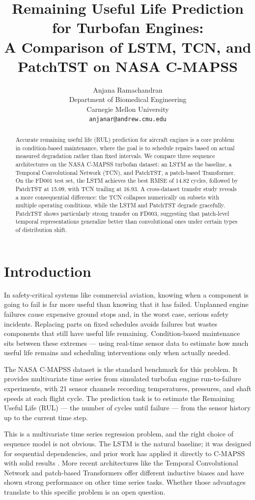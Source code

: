 \documentclass{article}
\title{Remaining Useful Life Prediction for Turbofan Engines:\\
A Comparison of LSTM, TCN, and PatchTST on NASA C-MAPSS}
\author{
  Anjana Ramachandran \\
  Department of Biomedical Engineering \\
  Carnegie Mellon University \\
  \texttt{anjanar@andrew.cmu.edu}
}
\begin{document}
\maketitle

\begin{abstract}
Accurate remaining useful life (RUL) prediction for aircraft engines is a core problem in condition-based maintenance, where the goal is to schedule repairs based on actual measured degradation rather than fixed intervals. We compare three sequence architectures on the NASA C-MAPSS turbofan dataset: an LSTM as the baseline, a Temporal Convolutional Network (TCN), and PatchTST, a patch-based Transformer. On the FD001 test set, the LSTM achieves the best RMSE of 14.82 cycles, followed by PatchTST at 15.09, with TCN trailing at 16.93. A cross-dataset transfer study reveals a more consequential difference: the TCN collapses numerically on subsets with multiple operating conditions, while the LSTM and PatchTST degrade gracefully. PatchTST shows particularly strong transfer on FD003, suggesting that patch-level temporal representations generalize better than convolutional ones under certain types of distribution shift.
\end{abstract}


\section{Introduction}

In safety-critical systems like commercial aviation, knowing when a component is going to fail is far more useful than knowing that it has failed. Unplanned engine failures cause expensive ground stops and, in the worst case, serious safety incidents. Replacing parts on fixed schedules avoids failures but wastes components that still have useful life remaining. Condition-based maintenance sits between these extremes — using real-time sensor data to estimate how much useful life remains and scheduling interventions only when actually needed.

The NASA C-MAPSS dataset \citep{saxena2008damage} is the standard benchmark for this problem. It provides multivariate time series from simulated turbofan engine run-to-failure experiments, with 21 sensor channels recording temperatures, pressures, and shaft speeds at each flight cycle. The prediction task is to estimate the Remaining Useful Life (RUL) — the number of cycles until failure — from the sensor history up to the current time step.

This is a multivariate time series regression problem, and the right choice of sequence model is not obvious. The LSTM \citep{hochreiter1997long} is the natural baseline; it was designed for sequential dependencies, and prior work has applied it directly to C-MAPSS with solid results \citep{zheng2017long}. More recent architectures like the Temporal Convolutional Network \citep{bai2018empirical} and patch-based Transformers \citep{nie2023time} offer different inductive biases and have shown strong performance on other time series tasks. Whether those advantages translate to this specific problem is an open question.
\end{document}
